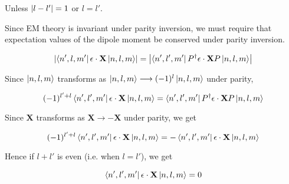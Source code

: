 Unless  $\abs{l - l'} = 1$ or $l = l'$. 

Since EM theory is invariant under parity inversion, we must require that expectation values of the dipole moment be conserved under parity inversion.

\begin{equation}
    \abs{\bra{n',l,m'} \mathbf{\epsilon} \cdot \mathbf{X} \ket{n,l,m}} = \abs{\bra{n',l',m'} P^{\dagger} \mathbf{\epsilon}\cdot \mathbf{X}  P  \ket{n,l,m}} 
\end{equation}

Since $\ket{n,l,m}$ transforms as $\ket{n,l,m} \longrightarrow (-1)^l \ket{n,l,m}$ under parity,

\begin{equation}
    (-1)^{l' + l}\bra{n',l',m'} \mathbf{\epsilon} \cdot \mathbf{X} \ket{n,l,m} = \bra{n',l',m'} P^\dagger  \mathbf{\epsilon}\cdot \mathbf{X} P \ket{n,l,m}
\end{equation}

Since $ \mathbf{X}  $ transforms as $ \mathbf{X}   \longrightarrow - \mathbf{X}  $ under parity, we get

\begin{equation}
    (-1)^{l' + l}\bra{n',l',m'} \mathbf{\epsilon} \cdot \mathbf{X} \ket{n,l,m} = -\bra{n',l',m'}  \mathbf{\epsilon}\cdot \mathbf{X}\ket{n,l,m}
\end{equation}

Hence if $l + l'$ is even (i.e. when $l = l'$), we get 

\begin{equation}
    \bra{n',l',m'} \mathbf{\epsilon} \cdot \mathbf{X} \ket{n,l,m} = 0
\end{equation}
